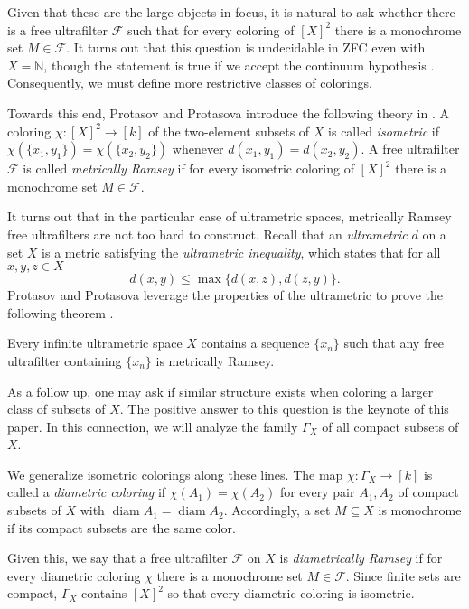 Given that these are the large objects in focus, it is natural to ask whether there is a free ultrafilter \( \mathcal{F}  \) such that for every coloring of \( [X]^{2}  \) there is a monochrome set \( M \in \mathcal{F}  \). It turns out that this question is undecidable in ZFC even with \( X = \mathbb{N}  \), though the statement is true if we accept the continuum hypothesis \cite{protasov:2017}. Consequently, we must define more restrictive classes of colorings.

Towards this end, Protasov and Protasova introduce the following theory in \cite{protasov:2017}. A coloring \( \chi : [X]^{2} \to [k]  \) of the two-element subsets of \( X \) is called \emph{isometric} if \( \chi (\{ x_1, y_1 \} ) = \chi (\{ x_2, y_2 \} ) \) whenever \( d(x_1, y_1) = d(x_2, y_2) \). A free ultrafilter \( \mathcal{F}  \) is called \emph{metrically Ramsey} if for every isometric coloring of \( [X]^{2}  \) there is a monochrome set \( M \in \mathcal{F}  \).

It turns out that in the particular case of ultrametric spaces, metrically Ramsey free ultrafilters are not too hard to construct. Recall that an \emph{ultrametric} \( d \) on a set \( X \) is a metric satisfying the \emph{ultrametric inequality}, which states that for all \( x,y,z \in X \) \[ d(x,y) \leq \max \{ d(x,z), d(z,y) \}.  \] Protasov and Protasova leverage the properties of the ultrametric to prove the following theorem \cite{protasov:2017}.

\begin{theorem}
\label{thm:1}
Every infinite ultrametric space \( X \) contains a sequence \( \{x_{n}\} \) such that any free ultrafilter containing \( \{x_{n}\} \) is metrically Ramsey.
\end{theorem}

As a follow up, one may ask if similar structure exists when coloring a larger class of subsets of \( X \). The positive answer to this question is the keynote of this paper. In this connection, we will analyze the family \( \Gamma_{X}  \) of all compact subsets of \( X \).

We generalize isometric colorings along these lines. The map \( \chi : \Gamma_{X}  \to [k] \) is called a \emph{diametric coloring} if \( \chi (A_1) = \chi (A_2) \) for every pair \( A_1, A_2 \) of compact subsets of \( X \) with \( \operatorname{diam} A_1 = \operatorname{diam} A_2  \). Accordingly, a set \( M \subseteq X \) is monochrome if its compact subsets are the same color. 

Given this, we say that a free ultrafilter \( \mathcal{F}  \) on \( X \) is \emph{diametrically Ramsey} if for every diametric coloring \( \chi \) there is a monochrome set \( M  \in \mathcal{F}  \). Since finite sets are compact, \( \Gamma_{X}  \) contains \( [X]^{2}  \) so that every diametric coloring is isometric.

